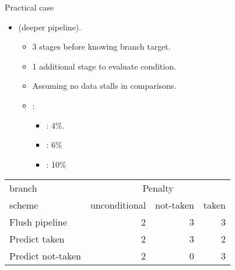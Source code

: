 \begin{frame}[t]{Practical case}
\begin{itemize}
  \item {} (deeper pipeline).
    \begin{itemize}
      \item 3 stages before knowing branch target.
      \item 1 additional stage to evaluate condition.
      \item Assuming no data stalls in comparisons.
      \item {}:
        \begin{itemize}
          \item {}: 4\%.
          \item {}: 6\%
          \item {}: 10\%
        \end{itemize}
    \end{itemize}
\end{itemize}

{\scriptsize
\begin{tabular}[c]{|p{}|*{3}{p{}|}}
\hline
branch &  \multicolumn{3}{c|}{Penalty}
\\
\cline{2-4}
scheme & unconditional & not-taken & taken
\\
\hline\hline

Flush pipeline &
\multicolumn{1}{r|}{2} & 
\multicolumn{1}{r|}{3} & 
\multicolumn{1}{r|}{3}
\\
\hline

Predict taken &
\multicolumn{1}{r|}{2} & 
\multicolumn{1}{r|}{3} &
\multicolumn{1}{r|}{2}
\\
\hline

Predict not-taken &
\multicolumn{1}{r|}{2} &
\multicolumn{1}{r|}{0} &
\multicolumn{1}{r|}{3}
\\

\hline
\end{tabular}
}
\end{frame}

